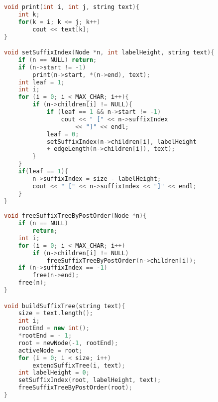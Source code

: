 \begin{lstlisting}[language=C++]
void print(int i, int j, string text){
    int k;
    for(k = i; k <= j; k++)
        cout << text[k];
}

void setSuffixIndex(Node *n, int labelHeight, string text){
    if (n == NULL) return;
    if (n->start != -1)
        print(n->start, *(n->end), text);
    int leaf = 1;
    int i;
    for (i = 0; i < MAX_CHAR; i++){
        if (n->children[i] != NULL){
            if (leaf == 1 && n->start != -1)
                cout << " [" << n->suffixIndex 
                    << "]" << endl;
            leaf = 0;
            setSuffixIndex(n->children[i], labelHeight
            + edgeLength(n->children[i]), text);
        }
    }
    if(leaf == 1){
        n->suffixIndex = size - labelHeight;
        cout << " [" << n->suffixIndex << "]" << endl;
    }
}
 
void freeSuffixTreeByPostOrder(Node *n){
    if (n == NULL)
        return;
    int i;
    for (i = 0; i < MAX_CHAR; i++)
        if (n->children[i] != NULL)
            freeSuffixTreeByPostOrder(n->children[i]);
    if (n->suffixIndex == -1)
        free(n->end);
    free(n);
}

void buildSuffixTree(string text){
    size = text.length();
    int i;
    rootEnd = new int();
    *rootEnd = - 1;
    root = newNode(-1, rootEnd);
    activeNode = root;
    for (i = 0; i < size; i++)
        extendSuffixTree(i, text);
    int labelHeight = 0;
    setSuffixIndex(root, labelHeight, text);
    freeSuffixTreeByPostOrder(root);
}
\end{lstlisting}